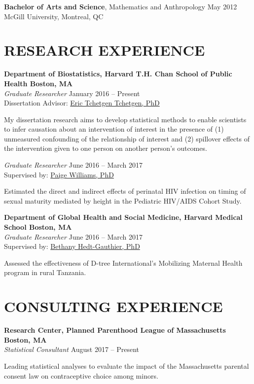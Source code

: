 \documentclass[12pt]{article}
\begin{document}
\textbf{Bachelor of Arts and Science}, Mathematics and Anthropology \hfill \hfill May 2012 \\
McGill University, Montreal, QC


\section*{\textbf{{\Large R}{\small ESEARCH} {\Large E}{\small XPERIENCE}}}

\textbf{Department of Biostatistics, Harvard T.H. Chan School of Public Health \hfill \hfill Boston, MA} \\
\textit{Graduate Researcher}  \hfill \hfill January 2016 -- Present \\
Dissertation Advisor: \href{https://statistics.wharton.upenn.edu/profile/ett/}{Eric Tchetgen Tchetgen, PhD} 
\begin{addmargin}[1em]{2em} My dissertation research aims to develop statistical methods to enable scientists to infer causation about an intervention of interest in the presence of (1) unmeasured confounding of the relationship of interest and (2) spillover effects of the intervention given to one person on another person's outcomes. \end{addmargin} 
\vspace{.2cm}
\textit{Graduate Researcher} \hfill \hfill June 2016 -- March 2017 \\
Supervised by: \href{https://www.hsph.harvard.edu/paige-williams/}{Paige Williams, PhD} 
\begin{addmargin}[1em]{2em}  Estimated the direct and indirect effects of perinatal HIV infection on timing of sexual maturity mediated by height in the Pediatric HIV/AIDS Cohort Study. \end{addmargin} 
\vspace{.2cm}
\textbf{Department of Global Health and Social Medicine, Harvard Medical School \hfill \hfill Boston, MA} \\
\textit{Graduate Researcher} \hfill \hfill June 2016 -- March 2017 \\
Supervised by: \href{https://ghsm.hms.harvard.edu/person/faculty/bethany-hedt-gauthier}{Bethany Hedt-Gauthier, PhD} 
\begin{addmargin}[1em]{2em} Assessed the effectiveness of D-tree International's Mobilizing Maternal Health program in rural Tanzania. \end{addmargin}


\section*{\textbf{{\Large C}{\small ONSULTING} {\Large E}{\small XPERIENCE}}}
\textbf{Research Center, Planned Parenthood League of Massachusetts \hfill \hfill Boston, MA}  \\
\textit{ Statistical Consultant} \hfill \hfill August 2017 -- Present
\begin{addmargin}[1em]{2em} Leading statistical analyses to evaluate the impact of the Massachusetts parental consent law on contraceptive choice among minors. \\ \end{addmargin} 
\end{document}
